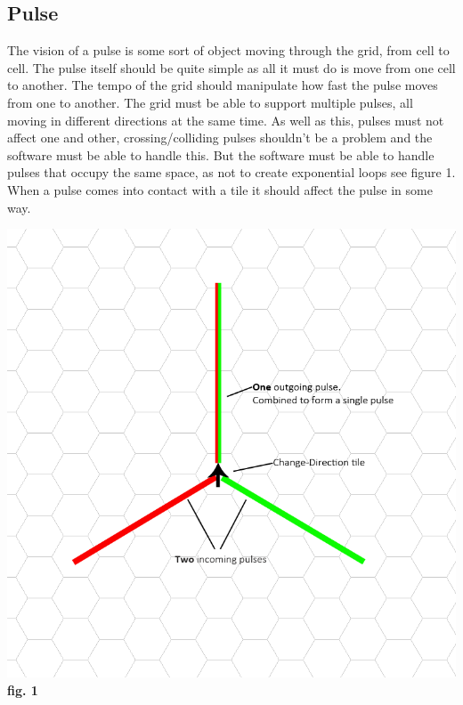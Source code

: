 \documentclass[10pt,a4paper]{article}
\begin{document}
\subsection{Pulse}
The vision of a pulse is some sort of object moving through the grid, from cell to cell. The pulse itself should be quite simple as all it must do is move from one cell to another. The tempo of the grid should manipulate how fast the pulse moves from one to another. The grid must be able to support multiple pulses, all moving in different directions at the same time. As well as this, pulses must not affect one and other, crossing/colliding pulses shouldn't be a problem and the software must be able to handle this. But the software must be able to handle pulses that occupy the same space, as not to create exponential loops see figure 1. When a pulse comes into contact with a tile it should affect the pulse in some way.
\begin{center}
\includegraphics[scale=0.5]{6.png}
\textbf{fig. 1}
\end{center}
\end{document}
